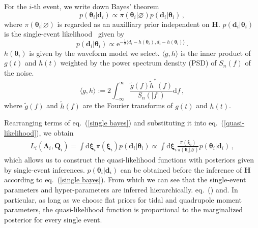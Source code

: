 \documentclass[a4paper,11pt]{article}
\begin{document}

For the $i\text{-th}$ event, we write down Bayes' theorem
\begin{equation}
\label{single bayes}
    p(\bm{\theta}_i|\bm{d}_i)\propto \pi(\bm{\theta}_i|\varnothing)p(\bm{d}_i|\bm{\theta}_i)\,,
\end{equation}
where $\pi(\bm{\theta}_i|\varnothing)$ is regarded as an auxilliary prior independent on $\bm{H}$. $p(\bm{d}_i|\bm{\theta}_i)$ is the single-event likelihood~\cite{Finn:1992wt} given by
\begin{equation}
p(\bm{d}_i|\bm{\theta}_i)\propto \mathrm{e}^{-\frac{1}{2}\langle d_i-h(\bm{\theta}_i),d_i-h(\bm{\theta}_i)\rangle}\,.
\end{equation}
$h(\bm{\theta}_i)$ is given by the waveform model we select. $\langle g, h\rangle$ is the inner product of $g(t)$ and $h(t)$ weighted by the power spectrum density (PSD) of $S_n(f)$ of the noise.
\begin{equation}
    \langle g, h\rangle:= 2\int_{-\infty}^{\infty}\frac{\tilde{g}(f)\tilde{h}^{*}(f)}{S_n(|f|)} \text{d}f\,,
\end{equation}
where $\tilde{g}(f)$ and $\tilde{h}(f)$ are the Fourier transforms of $g(t)$ and $h(t)$.

Rearranging terms of eq.~(\ref{single bayes}) and substituting it into eq.~(\ref{quasi-likelihood}), we obtain
\begin{equation}
\label{quasi-posterior}
\begin{aligned}
    L_i(\bm{\Lambda}_i,\bm{Q}_i) = \int \text{d}\bm{\xi}_i \pi(\bm{\xi}_i)p(\bm{d}_i|\bm{\theta}_i) \propto \int \text{d}\bm{\xi}_i \frac{\pi(\bm{\xi}_i)}{\pi(\bm{\theta}_i|\varnothing)}p(\bm{\theta}_i|\bm{d}_i)\,,
\end{aligned}  
\end{equation}
which allows us to construct the quasi-likelihood functions with posteriors given by single-event inferences. $p(\bm{\theta}_i|\bm{d}_i)$ can be obtained before the inference of $\bm{H}$ according to eq.~(\ref{single bayes}). 
From which we can see that the single-event parameters and hyper-parameters are inferred hierarchically. 
eq.~() and. In particular, as long as we choose flat priors for tidal and quadrupole moment parameters, the quasi-likelihood function is proportional to the marginalized posterior for every single event. 
\end{document}
